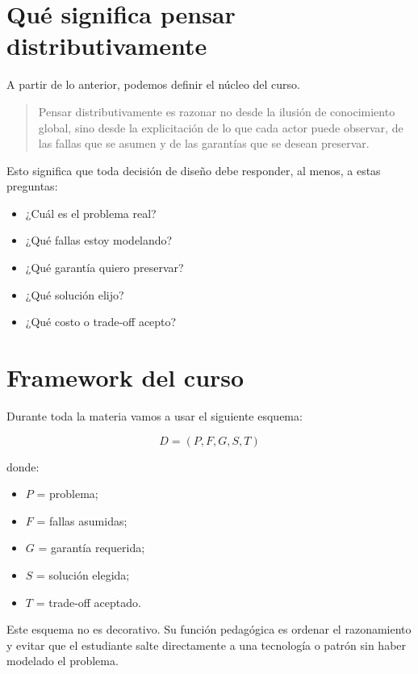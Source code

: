 \documentclass[variant=apuntes,cover=institutional,mode=screen]{ua-engineering-v6-article}
\begin{document}
\section{Qué significa pensar distributivamente}\label{sec:que-significa-pensar-distributivamente}

A partir de lo anterior, podemos definir el núcleo del curso.

\begin{quote}
Pensar distributivamente es razonar no desde la ilusión de conocimiento global, sino desde la explicitación de lo que cada actor puede observar, de las fallas que se asumen y de las garantías que se desean preservar.
\end{quote}

Esto significa que toda decisión de diseño debe responder, al menos, a estas preguntas:

\begin{itemize}
\item ¿Cuál es el problema real?
\item ¿Qué fallas estoy modelando?
\item ¿Qué garantía quiero preservar?
\item ¿Qué solución elijo?
\item ¿Qué costo o trade-off acepto?
\end{itemize}

\section{Framework del curso}\label{sec:framework-del-curso}

Durante toda la materia vamos a usar el siguiente esquema:

\[
D = (P, F, G, S, T)
\]

donde:

\begin{itemize}
\item $P$ = problema;
\item $F$ = fallas asumidas;
\item $G$ = garantía requerida;
\item $S$ = solución elegida;
\item $T$ = trade-off aceptado.
\end{itemize}

Este esquema no es decorativo.
Su función pedagógica es ordenar el razonamiento y evitar que el estudiante salte directamente a una tecnología o patrón sin haber modelado el problema.
\end{document}
